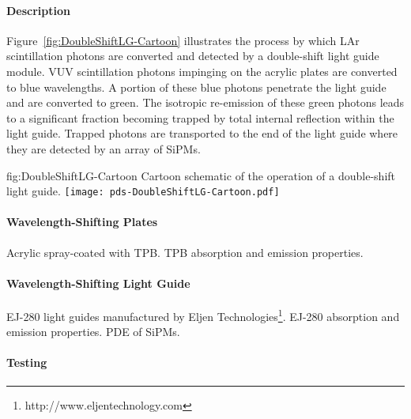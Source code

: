 \paragraph*{Description}

Figure~\ref{fig:DoubleShiftLG-Cartoon} illustrates the process by which LAr scintillation 
photons are converted and detected by a double-shift light guide module. VUV scintillation
 photons impinging on the acrylic plates are converted to blue wavelengths. A portion of
 these blue photons penetrate the light guide and are converted to green. The isotropic 
re-emission of these green photons leads to a significant fraction becoming trapped by 
total internal reflection within the light guide. Trapped photons are transported to 
the end of the light guide where they are detected by an array of SiPMs.


\begin{dunefigure}{fig:DoubleShiftLG-Cartoon}
{Cartoon schematic of the operation of a double-shift light guide.}
  \texttt{[image: pds-DoubleShiftLG-Cartoon.pdf]}
\end{dunefigure}

\paragraph*{Wavelength-Shifting Plates}

Acrylic spray-coated with TPB. TPB absorption and emission properties.

\paragraph*{Wavelength-Shifting Light Guide}

EJ-280 light guides manufactured by Eljen Technologies\footnote{http://www.eljentechnology.com}. 
EJ-280 absorption and emission properties. PDE of SiPMs.

\paragraph*{Testing}

